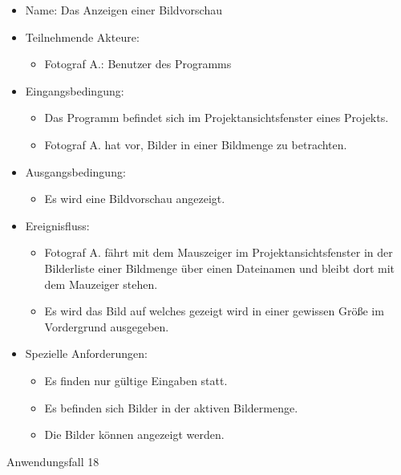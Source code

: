 	\begin{itemize}
		\item Name: Das Anzeigen einer Bildvorschau
		\item Teilnehmende Akteure:
		\begin{itemize}
			\item	Fotograf A.: Benutzer des Programms		
		\end{itemize}
		\item Eingangsbedingung:
		\begin{itemize}
			\item	Das Programm befindet sich im Projektansichtsfenster eines Projekts.
			\item Fotograf A. hat vor, Bilder in einer Bildmenge zu betrachten.
		\end{itemize}
		\item Ausgangsbedingung:
		\begin{itemize}
			\item	Es wird eine Bildvorschau angezeigt.	
		\end{itemize}
		\item Ereignisfluss:
		\begin{itemize}
			\item Fotograf A. fährt mit dem Mauszeiger im Projektansichtsfenster in der Bilderliste einer Bildmenge über einen Dateinamen und bleibt dort mit dem Mauzeiger stehen.
			\item Es wird das Bild auf welches gezeigt wird in einer gewissen Größe im Vordergrund ausgegeben.
		\end{itemize}
		\item Spezielle Anforderungen:
		\begin{itemize}
			\item	Es finden nur gültige Eingaben statt.
			\item Es befinden sich Bilder in der aktiven Bildermenge.
			\item Die Bilder können angezeigt werden.			
		\end{itemize}			
	\end{itemize}
	
	\begin{description}
		\item[Anwendungsfall 18]
	\end{description}
	
